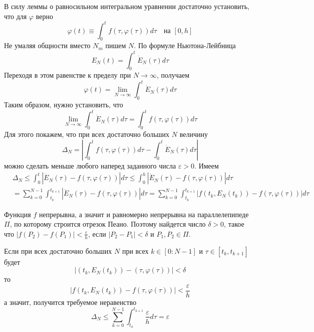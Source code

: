 В силу леммы о равносильном интегральном уравнении достаточно установить, что для $\varphi$ верно
\begin{equation*}
    \varphi(t) \equiv \int_{0}^{t} f(\tau, \varphi(\tau))d\tau \quad \text{на } [0,h]
\end{equation*}
Не умаляя общности вместо $N_m$ пишем $N$. По формуле Ньютона-Лейбница
\begin{equation*}
    E_N(t) = \int_{0}^{t} \dot{E}_N(\tau)d\tau
\end{equation*}
Переходя в этом равенстве к пределу при $N \to \infty$, получаем
\begin{equation*}
    \varphi(t) = \lim_{N \to \infty} \int_{0}^{t}\dot{E}_N(\tau)d\tau
\end{equation*}
Таким образом, нужно установить, что
\begin{equation*}
    \lim_{N \to \infty} \int_{0}^{t}\dot{E}_N(\tau)d\tau = \int_{0}^{t}f(\tau, \varphi(\tau))d\tau
\end{equation*}
Для этого покажем, что при всех достаточно больших $N$ величину
\begin{equation*}
    \Delta_N = \left|\int_{0}^{t}f(\tau, \varphi(\tau))d\tau - \int_{0}^{t}\dot{E}_N(\tau)d\tau\right|
\end{equation*}
можно сделать меньше любого наперед заданного числа $\varepsilon > 0$. Имеем
\begin{equation*}
    \begin{aligned}
        &\Delta_N \le \int_{0}^{t}|\dot{E}_N(\tau) - f(\tau, \varphi(\tau))|d\tau \le \int_{0}^{h}|\dot{E}_N(\tau) - f(\tau, \varphi(\tau))|d\tau\\
        &=\sum_{k=0}^{N-1}\int_{t_k}^{t_{k+1}}|\dot{E}_N(\tau) - f(\tau, \varphi(\tau))|d\tau = \sum_{k=0}^{N-1}\int_{t_k}^{t_{k+1}}|f(t_k, E_N(t_k)) - f(\tau, \varphi(\tau))|d\tau
    \end{aligned}
\end{equation*}

Функция $f$ непрерывна, а значит и равномерно непрерывна на параллелепипеде $\Pi$, по которому строится отрезок Пеано. Поэтому найдется число $\delta > 0$, такое что $|f(P_2) - f(P_1)| < \frac{\varepsilon}{h}$, если $|P_2 - P_1| < \delta$ и $P_1, P_2 \in \Pi$.

Если при всех достаточно больших $N$ при всех $k \in [0 : N - 1]$ и $\tau \in [t_k, t_{k+1}]$ будет
\begin{equation}
    |(t_k, E_N(t_k)) - (\tau, \varphi(\tau))| < \delta \label{eulerineq}
\end{equation}
то
\begin{equation*}
    |f(t_k, E_N(t_k)) - f(\tau, \varphi(\tau))| < \frac{\varepsilon}{h}
\end{equation*}
а значит, получится требуемое неравенство
\begin{equation*}
    \Delta_N \le \sum_{k=0}^{N-1}\int_{t_k}^{t_{k+1}}\frac{\varepsilon}{h}d\tau = \varepsilon
\end{equation*}

